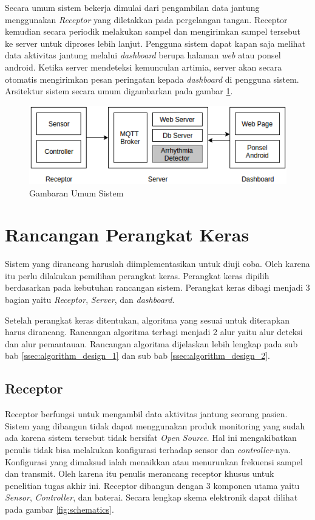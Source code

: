 Secara umum sistem bekerja dimulai dari pengambilan data jantung menggunakan \textit{Receptor} yang diletakkan pada pergelangan tangan. Receptor kemudian secara periodik melakukan sampel dan mengirimkan sampel tersebut ke server untuk diproses lebih lanjut. Pengguna sistem dapat kapan saja melihat data aktivitas jantung melalui \textit{dashboard} berupa halaman \textit{web} atau ponsel android. Ketika server mendeteksi kemunculan artimia, server akan secara otomatis mengirimkan pesan peringatan kepada \textit{dashboard} di pengguna sistem. Arsitektur sistem secara umum digambarkan pada gambar \ref{fig:gambar_umum}.

\begin{figure}[H]
	\centering
	\includegraphics[scale=0.8]{images/gambar_umum.png}
    \caption{Gambaran Umum Sistem}
	\label{fig:gambar_umum}
\end{figure}

\section{Rancangan Perangkat Keras}
Sistem yang dirancang haruslah diimplementasikan untuk diuji coba. Oleh karena itu perlu dilakukan pemilihan perangkat keras. Perangkat keras dipilih berdasarkan pada kebutuhan rancangan sistem. Perangkat keras dibagi menjadi 3 bagian yaitu \textit{Receptor}, \textit{Server}, dan \textit{dashboard}.

Setelah perangkat keras ditentukan, algoritma yang sesuai untuk diterapkan harus dirancang. Rancangan algoritma terbagi menjadi 2 alur yaitu alur deteksi dan alur pemantauan. Rancangan algoritma dijelaskan lebih lengkap pada sub bab \ref{ssec:algorithm_design_1} dan sub bab \ref{ssec:algorithm_design_2}.

\subsection{Receptor}
Receptor berfungsi untuk mengambil data aktivitas jantung seorang pasien. Sistem yang dibangun tidak dapat menggunakan produk monitoring yang sudah ada karena sistem tersebut tidak bersifat \textit{Open Source}. Hal ini mengakibatkan penulis tidak bisa melakukan konfigurasi terhadap sensor dan \textit{controller}-nya. Konfigurasi yang dimaksud ialah menaikkan atau menurunkan frekuensi sampel dan transmit. Oleh karena itu penulis merancang receptor khusus untuk penelitian tugas akhir ini. Receptor dibangun dengan 3 komponen utama yaitu \textit{Sensor}, \textit{Controller}, dan baterai. Secara lengkap skema elektronik dapat dilihat pada gambar \ref{fig:schematics}.

